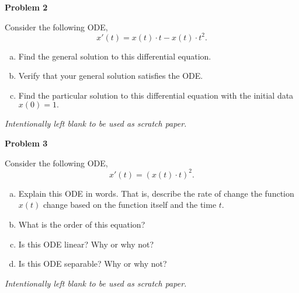 \documentclass[12pt]{amsbook}
\begin{document}
\newpage

\textbf{Problem 2}

\vspace{.25cm}

Consider the following ODE,
\[
x'(t) = x(t)\cdot t-x(t)\cdot t^2.
\]
\vspace*{.5cm}
\begin{enumerate}[(a)]
    \item Find the general solution to this differential equation.
    \vspace*{7cm}
    \item Verify that your general solution satisfies the ODE.
    \vspace*{5cm}
    \item Find the particular solution to this differential equation with the initial data $x(0)=1.$
\end{enumerate}



\newpage
\emph{Intentionally left blank to be used as scratch paper.}\\






\newpage

\textbf{Problem 3}

\vspace{.25cm}

Consider the following ODE,
\[
x'(t) = (x(t)\cdot t)^2.
\]
\vspace*{.5cm}
\begin{enumerate}[(a)]
    \item Explain this ODE in words. That is, describe the rate of change the function $x(t)$ change based on the function itself and the time $t$.
    \vspace*{5cm}
    \item What is the order of this equation?
    \vspace*{2cm}
    \item Is this ODE linear? Why or why not?
    \vspace*{5cm}
    \item Is this ODE separable? Why or why not?
\end{enumerate}


\newpage
\emph{Intentionally left blank to be used as scratch paper.}\\
\end{document}
